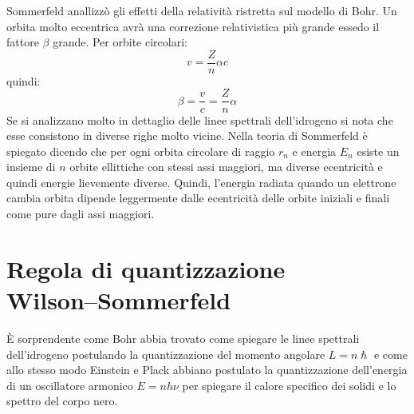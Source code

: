 Sommerfeld anallizzò gli effetti della relatività ristretta sul modello di Bohr. Un orbita molto eccentrica avrà una correzione relativistica più grande essedo il fattore $\beta$ grande. Per orbite circolari:
\begin{equation}
	v=\frac{Z}{n}\alpha c
\end{equation}
quindi:
\begin{equation}
	\beta=\frac{v}{c}=\frac{Z}{n}\alpha
	\label{betabohr}
\end{equation}
Se si analizzano molto in dettaglio delle linee spettrali dell'idrogeno si nota che esse consistono in diverse righe molto vicine. Nella teoria di Sommerfeld è spiegato dicendo che per ogni orbita circolare di raggio $r_n$ e energia $E_n$ esiste un insieme di $n$ orbite ellittiche con stessi assi maggiori, ma diverse ecentricità e quindi energie lievemente diverse. Quindi, l'energia radiata quando un elettrone cambia orbita dipende leggermente dalle ecentricità delle orbite iniziali e finali come pure dagli assi maggiori.
\section[Regola di quantizzazione Wilson--Sommerfeld]{Regola di quantizzazione\\ Wil\-son--Som\-mer\-feld}
\`E sorprendente come Bohr abbia trovato come spiegare le linee spettrali dell'idrogeno postulando la quantizzazione del momento angolare $L=n\hslash$ e come allo stesso modo Einstein e Plack abbiano postulato la quantizzazione dell'energia di un oscillatore armonico $E=nh\nu$ per spiegare il calore specifico dei solidi e lo spettro del corpo nero.


